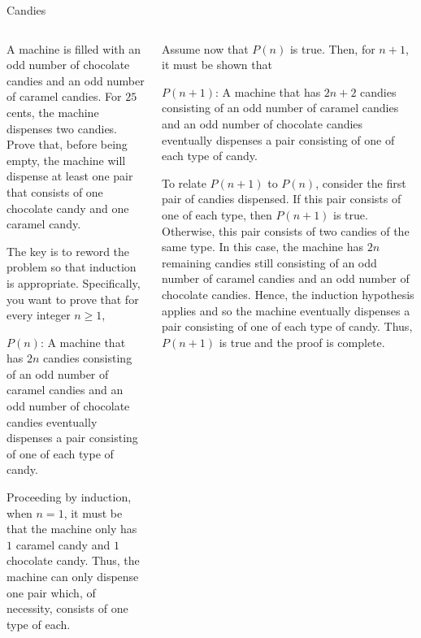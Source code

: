 \documentclass[9pt,aspectratio=169]{beamer}
\begin{document}
\begin{frame}{Candies}
  \begin{columns}[T]
    \begin{column}{0.5\textwidth}
      \begin{problem}
        A machine is filled with an odd number of chocolate candies and an odd number of caramel candies. For $25$ cents, the machine dispenses two candies. Prove that, before being empty, the machine will dispense at least one pair that consists of one chocolate candy and one caramel candy.
      \end{problem}\pause

      The key is to reword the problem so that induction is appropriate. Specifically, you want to prove that for every integer $n \geq 1$,\pause

      \smallskip
      $P(n)$: A machine that has $2n$ candies consisting of an odd number of caramel candies and an odd number of chocolate candies eventually dispenses a pair consisting of one of each type of candy.
      \smallskip\pause

      Proceeding by induction, when $n = 1$, it must be that the machine only has $1$ caramel candy and $1$ chocolate candy. Thus, the machine can only dispense one pair which, of necessity, consists of one type of each.\pause
    \end{column}
    \begin{column}{0.5\textwidth}
      Assume now that $P(n)$ is true. Then, for $n + 1$, it must be shown that
      \smallskip

      $P(n+1)$: A machine that has $2n + 2$ candies consisting of an odd number of caramel candies and an odd number of chocolate candies eventually dispenses a pair consisting of one of each type of candy.
      \smallskip\pause
    
      To relate $P(n + 1)$ to $P(n)$, consider the first pair of candies dispensed. If this pair consists of one of each type, then $P(n + 1)$ is true. Otherwise, this pair consists of two candies of the same type. In this case, the machine has $2n$ remaining candies still consisting of an odd number of caramel candies and an odd number of chocolate candies. Hence, the induction hypothesis applies and so the machine eventually dispenses a pair consisting of one of each type of candy. Thus, $P(n + 1)$ is true and the proof is complete.
    \end{column}
  \end{columns}
\end{frame}
\end{document}
